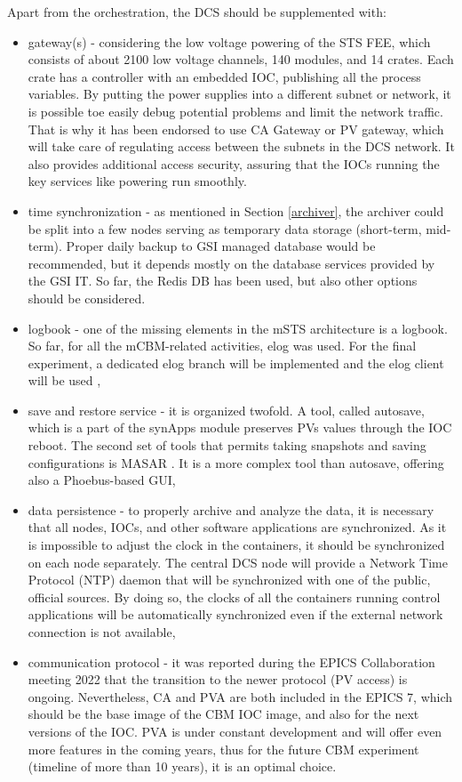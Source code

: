  Apart from the orchestration, the \gls{DCS} should be supplemented with:
 \begin{itemize}
      \item gateway(s) - considering the low voltage powering of the \gls{STS} \gls{FEE}, which consists of about 2100 low voltage channels, 140 modules, and 14 crates. Each crate has a controller with an embedded \gls{IOC}, publishing all the process variables. By putting the power supplies into a different subnet or network, it is possible toe easily debug potential problems and limit the network traffic. That is why it has been endorsed to use CA Gateway \cite{gateway} or \gls{PV} gateway, which will take care of regulating access between the subnets in the DCS network. It also provides additional access security, assuring that the \glspl{IOC} running the key services like powering run smoothly.
     \item time synchronization - as mentioned in Section \ref{archiver}, the archiver could be split into a few nodes serving as temporary data storage (short-term, mid-term). Proper daily backup to GSI managed database would be recommended, but it depends mostly on the database services provided by the GSI IT. So far, the Redis DB has been used, but also other options should be considered.       
     \item logbook - one of the missing elements in the \gls{mSTS} architecture is a logbook. So far, for all the mCBM-related activities, elog \cite{elog} was used. For the final experiment, a dedicated elog branch will be implemented and the elog client will be used \cite{elog_client},
     \item save and restore service - it is organized twofold. A tool, called autosave, which is a part of the synApps module \cite{autosave} preserves \glspl{PV} values through the \gls{IOC} reboot. The second set of tools that permits taking snapshots and saving configurations is MASAR \cite{masar}. It is a more complex tool than autosave, offering also a Phoebus-based \gls{GUI},
     \item data persistence - to properly archive and analyze the data, it is necessary that all nodes, \glspl{IOC}, and other software applications are synchronized. As it is impossible to adjust the clock in the containers, it should be synchronized on each node separately. The central \gls{DCS} node will provide a Network Time Protocol (\gls{NTP}) daemon that will be synchronized with one of the public, official sources.  By doing so, the clocks of all the containers running control applications will be automatically synchronized even if the external network connection is not available,
     \item communication protocol - it was reported during the EPICS Collaboration meeting 2022 \cite{epics_2022} that the transition to the newer protocol (PV access) is ongoing. Nevertheless, CA and PVA are both included in the EPICS 7, which should be the base image of the \gls{CBM} \gls{IOC} image, and also for the next versions of the \gls{IOC}. PVA is under constant development and will offer even more features in the coming years, thus for the future CBM experiment (timeline of more than 10 years), it is an optimal choice. 
 \end{itemize}



